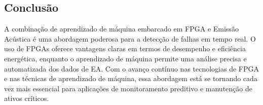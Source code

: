 \subsection{Conclusão}
A combinação de aprendizado de máquina embarcado em FPGA e Emissão Acústica é uma abordagem poderosa para a detecção de falhas em tempo real. O uso de FPGAs oferece vantagens claras em termos de desempenho e eficiência energética, enquanto o aprendizado de máquina permite uma análise precisa e automatizada dos dados de EA. Com o avanço contínuo nas tecnologias de FPGA e nas técnicas de aprendizado de máquina, essa abordagem está se tornando cada vez mais essencial para aplicações de monitoramento preditivo e manutenção de ativos críticos.

